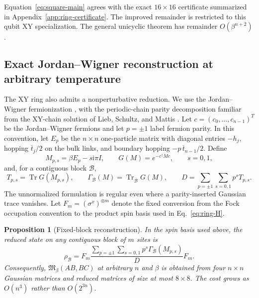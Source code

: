 \documentclass[11pt]{article}
\newcommand{\Tr}{\operatorname{Tr}}
\newcommand{\Mmod}{\mathfrak{M}}
\newcommand{\ii}{\mathrm{i}}
\newtheorem{proposition}[theorem]{Proposition}
\begin{document}
Equation~\eqref{eq:square-main} agrees with the exact $16\times16$
certificate summarized in Appendix~\ref{app:ring-certificate}.  The improved
remainder is restricted to this qubit XY specialization.  The general
unicyclic theorem has remainder $O(\beta^{n+2})$.

\subsection{Exact Jordan--Wigner reconstruction at arbitrary temperature}

The XY ring also admits a nonperturbative reduction.  We use the
Jordan--Wigner fermionization \cite{JordanWigner1928}, with the periodic-chain
parity decomposition familiar from the XY-chain solution of Lieb, Schultz,
and Mattis \cite{LiebSchultzMattis1961}.  Let
$c=(c_0,\ldots,c_{n-1})^T$ be the Jordan--Wigner fermions and let $p=\pm1$
label fermion parity.  In this convention, let $E_p$ be the
$n\times n$ one-particle matrix with diagonal entries $-h_j$, hopping
$\overline t_j/2$ on the bulk links, and boundary hopping
$-p\,\overline t_{n-1}/2$.  Define
\begin{equation}
 M_{p,s}=\beta E_p-s\ii\pi I,
 \qquad
 G(M)=e^{-c^\dagger Mc},
 \qquad s=0,1,
 \label{eq:Gaussian-pieces}
\end{equation}
and, for a contiguous block $\mathcal B$,
\begin{equation}
 T_{p,s}=\Tr G(M_{p,s}),\qquad
 \Gamma_{\mathcal B}(M)=\Tr_{\overline{\mathcal B}}G(M),
 \qquad
 D=\sum_{p=\pm1}\sum_{s=0,1}p^sT_{p,s}.
 \label{eq:Gamma-block}
\end{equation}
The unnormalized formulation is regular even where a parity-inserted
Gaussian trace vanishes.  Let
$F_m=(\sigma^x)^{\otimes m}$ denote the fixed conversion from the Fock
occupation convention to the product spin basis used in
Eq.~\eqref{eq:ring-H}.

\begin{proposition}[Fixed-block reconstruction]
\label{prop:JW-reconstruction}
In the spin basis used above, the reduced state on any contiguous block of
$m$ sites is
\begin{equation}
 \rho_{\mathcal B}
 =F_m\frac{\displaystyle
 \sum_{p=\pm1}\sum_{s=0,1}p^s\Gamma_{\mathcal B}(M_{p,s})}{D}
 F_m.
 \label{eq:rho-block-JW}
\end{equation}
Consequently, $\Mmod_\beta(AB,BC)$ at arbitrary $n$ and $\beta$ is obtained
from four $n\times n$ Gaussian matrices and reduced matrices of size at most
$8\times8$.  The cost grows as $O(n^3)$ rather than $O(2^{3n})$.
\end{proposition}
\end{document}
